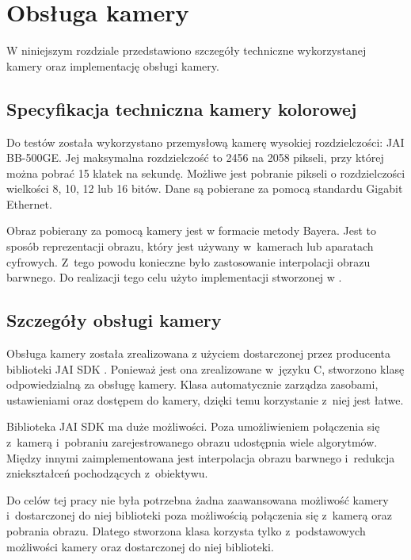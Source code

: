 \chapter{Obsługa kamery}
\label{cha:obslugakamery}

W niniejszym rozdziale przedstawiono szczegóły techniczne wykorzystanej kamery oraz implementację obsługi kamery.

\section{Specyfikacja techniczna kamery kolorowej}
\label{sec:specyfikacjaKamery}

Do testów została wykorzystano przemysłową kamerę wysokiej rozdzielczości: JAI BB-500GE. Jej maksymalna rozdzielczość to 2456 na 2058 pikseli, przy której można pobrać 15 klatek na sekundę. Możliwe jest pobranie pikseli o rozdzielczości wielkości 8, 10, 12 lub 16 bitów. Dane są pobierane za pomocą standardu Gigabit Ethernet. 

Obraz pobierany za pomocą kamery jest w formacie metody Bayera. Jest to sposób reprezentacji obrazu, który jest używany w~kamerach lub aparatach cyfrowych. Z~tego powodu konieczne było zastosowanie interpolacji obrazu barwnego. Do realizacji tego celu użyto implementacji stworzonej w \cite{BFIOCL}.

\section{Szczegóły obsługi kamery}
\label{sec:szczegolyObslugiKamery}

Obsługa kamery została zrealizowana z użyciem dostarczonej przez producenta biblioteki JAI SDK \cite{JAISDK}. Ponieważ jest ona zrealizowane w~języku C, stworzono klasę odpowiedzialną za obsługę kamery. Klasa automatycznie zarządza zasobami, ustawieniami oraz dostępem do kamery, dzięki temu korzystanie z~niej jest łatwe.

Biblioteka JAI SDK ma duże możliwości. Poza umożliwieniem połączenia się z~kamerą i~pobraniu zarejestrowanego obrazu udostępnia wiele algorytmów. Między innymi zaimplementowana jest interpolacja obrazu barwnego i~redukcja zniekształceń pochodzących z~obiektywu.

Do celów tej pracy nie była potrzebna żadna zaawansowana możliwość kamery i~dostarczonej do niej biblioteki poza możliwością połączenia się z~kamerą oraz pobrania obrazu. Dlatego stworzona klasa korzysta tylko z~podstawowych możliwości kamery oraz dostarczonej do niej biblioteki.

